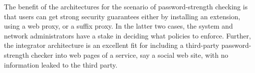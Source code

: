 \documentclass{llncs}
\begin{document}
The benefit of the architectures for the scenario of password-strength checking is
that users can get strong security guarantees either by installing an
extension, using a web proxy, or a suffix proxy. In the latter two
cases, the system and network administrators have a stake in deciding
what policies to enforce. Further, the integrator architecture is an
excellent fit for including a third-party password-strength checker
into web pages of a service, say a social web site, with no
information leaked to the third party.




\end{document}
